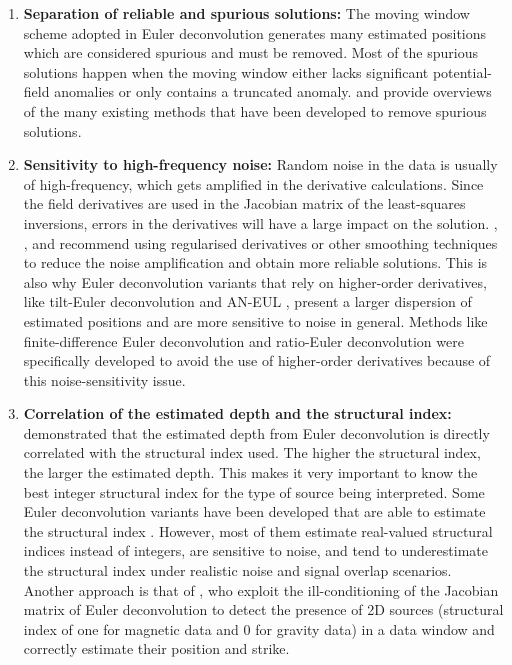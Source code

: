 \begin{enumerate}

\item \textbf{Separation of reliable and spurious solutions:} The moving window
    scheme adopted in Euler deconvolution generates many estimated positions
    which are considered spurious and must be removed. Most of the spurious
    solutions happen when the moving window either lacks significant
    potential-field anomalies or only contains a truncated anomaly.
    \citet{FitzGerald2004} and \citet{Melo2020} provide overviews of the many
    existing methods that have been developed to remove spurious solutions.

\item \textbf{Sensitivity to high-frequency noise:}
    Random noise in the data is
    usually of high-frequency, which gets amplified in the derivative
    calculations. Since the field derivatives are used in the Jacobian matrix
    of the least-squares inversions, errors in the derivatives will have
    a large impact on the solution. \citet{Pasteka2009}, \citet{Saleh2012}, and
    \citet{Florio2014} recommend using regularised derivatives or other
    smoothing techniques to reduce the noise amplification and obtain more
    reliable solutions. This is also why Euler deconvolution variants that rely
    on higher-order derivatives, like tilt-Euler deconvolution
    \citep{Salem2007,Huang2019} and AN-EUL \citep{Salem2003}, present a larger
    dispersion of estimated positions and are more sensitive to noise in
    general. Methods like finite-difference Euler deconvolution
    \citep{Gerovska2005} and ratio-Euler deconvolution \citep{Huang2022} were
    specifically developed to avoid the use of higher-order derivatives because
    of this noise-sensitivity issue.

\item \textbf{Correlation of the estimated depth and the structural index:}
    \citet{Silva2001} demonstrated that the estimated depth from Euler
    deconvolution is directly correlated with the structural index used. The
    higher the structural index, the larger the estimated depth. This makes it
    very important to know the best integer structural index for the type of
    source being interpreted. Some Euler deconvolution variants have been
    developed that are able to estimate the structural index
    \citep[e.g.,][]{Melo2013,Melo2018,Salem2003,Salem2007,Gerovska2005,Silva2003,Florio2013,Florio2014}.
    However, most of them estimate real-valued structural indices instead of
    integers, are sensitive to noise, and tend to underestimate the structural
    index under realistic noise and signal overlap scenarios.
    Another approach is that of \citet{Mushayandebvu2004}, who exploit the
    ill-conditioning of the Jacobian matrix of Euler deconvolution to detect
    the presence of 2D sources (structural index of one for magnetic data and
    0 for gravity data) in a data window and correctly estimate their
    position and strike.

\end{enumerate}

